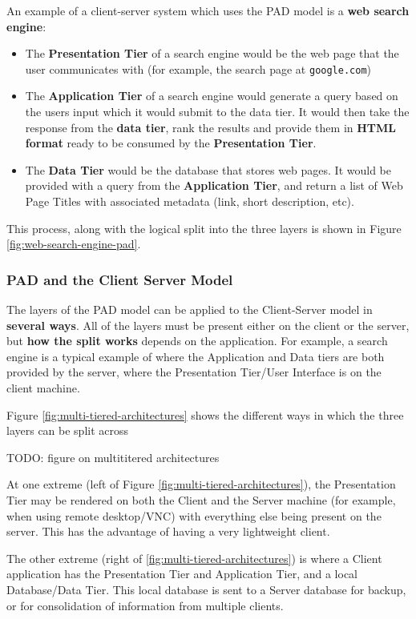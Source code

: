 \documentclass{article}
\begin{document}
An example of a client-server system which uses the PAD model is a \textbf{web search engine}:
\begin{itemize}
    \item The \textbf{Presentation Tier} of a search engine would be the web page that the user communicates with (for example, the search page at \texttt{google.com})
    \item The \textbf{Application Tier} of a search engine would generate a query based on the users input which it would submit to the data tier. It would then take the response from the \textbf{data tier}, rank the results and provide them in \textbf{HTML format} ready to be consumed by the \textbf{Presentation Tier}.
    \item The \textbf{Data Tier} would be the database that stores web pages. It would be provided with a query from the \textbf{Application Tier}, and return a list of Web Page Titles with associated metadata (link, short description, etc).
\end{itemize}
This process, along with the logical split into the three layers is shown in Figure \ref{fig:web-search-engine-pad}.

\subsubsection{PAD and the Client Server Model}

The layers of the PAD model can be applied to the Client-Server model in \textbf{several ways}. All of the layers must be present either on the client or the server, but \textbf{how the split works} depends on the application. For example, a search engine is a typical example of where the Application and Data tiers are both provided by the server, where the Presentation Tier/User Interface is on the client machine. 

Figure \ref{fig:multi-tiered-architectures} shows the different ways in which the three layers can be split across 

TODO: figure on multititered architectures

At one extreme (left of Figure \ref{fig:multi-tiered-architectures}), the Presentation Tier may be rendered on both the Client and the Server machine (for example, when using remote desktop/VNC) with everything else being present on the server. This has the advantage of having a very lightweight client.

The other extreme (right of \ref{fig:multi-tiered-architectures}) is where a Client application has the Presentation Tier and Application Tier, and a local Database/Data Tier. This local database is sent to a Server database for backup, or for consolidation of information from multiple clients. 
\end{document}
